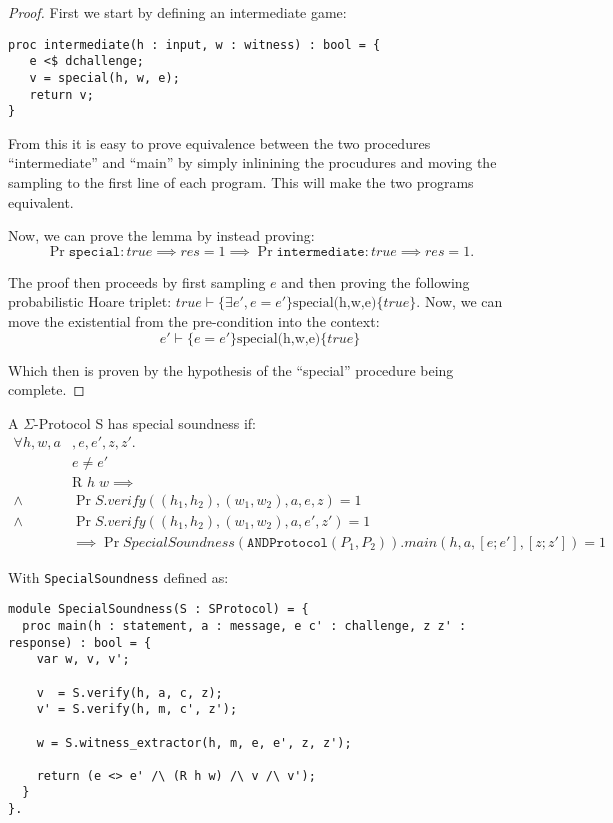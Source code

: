\begin{proof}
First we start by defining an intermediate game:
\begin{lstlisting}
proc intermediate(h : input, w : witness) : bool = {
   e <$ dchallenge;
   v = special(h, w, e);
   return v;
}
\end{lstlisting}

From this it is easy to prove equivalence between the two procedures
``intermediate'' and ``main'' by simply inlinining the procudures and moving
the sampling to the first line of each program. This will make the two programs
equivalent.

Now, we can prove the lemma by instead proving:
\begin{equation*}
  \Pr{\texttt{special} : true \implies res} = 1 \implies
  \Pr{\texttt{intermediate} : true \implies res} = 1.
\end{equation*}

The proof then proceeds by first sampling $e$ and then proving the following
probabilistic Hoare triplet: $true \vdash \{\exists e', e = e'\}
\text{special(h,w,e)} \{true\}$. Now, we can move the existential
from the pre-condition into the context:
\[
  e' \vdash \{e = e'\} \text{special(h,w,e)} \{true\}
\]

Which then is proven by the hypothesis of the ``special'' procedure being complete.
\end{proof}


\begin{definition}
\label{def:sigma:soundness}
  A $\Sigma$-Protocol S has special soundness if:
\begin{align*}
  \forall h,w,a&,e,e',z,z'. \\
    & e \neq e' \\
    & \text{R } h \; w \implies \\
    \land &\Pr{S.verify((h_{1}, h_{2}), (w_{1}, w_{2}), a,  e, z)} = 1 \\
    \land &\Pr{S.verify((h_{1}, h_{2}), (w_{1}, w_{2}), a, e', z')} = 1 \\
    &\implies \Pr{SpecialSoundness(\texttt{ANDProtocol}(P_{1}, P_{2})).main(h, a, [e;e'], [z;z'])} = 1
\end{align*}

With \texttt{SpecialSoundness} defined as:

\begin{lstlisting}[float, label=lst:sigma-soundness, caption= 2-special soundness game]
module SpecialSoundness(S : SProtocol) = {
  proc main(h : statement, a : message, e c' : challenge, z z' : response) : bool = {
    var w, v, v';

    v  = S.verify(h, a, c, z);
    v' = S.verify(h, m, c', z');

    w = S.witness_extractor(h, m, e, e', z, z');

    return (e <> e' /\ (R h w) /\ v /\ v');
  }
}.
\end{lstlisting}
\end{definition}

